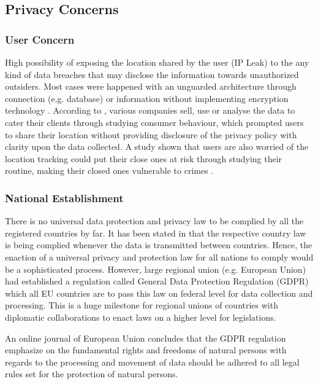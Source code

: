   \subsection{Privacy Concerns}
    \subsubsection{User Concern}
      \par High possibility of exposing the location shared by the user (IP Leak) to the any kind of data breaches that may disclose the information towards unauthorized outsiders. Most cases were happened with an unguarded architecture through connection (e.g. database) or information without implementing encryption technology \parencite{Ian1}. According to \textcite{Ian2}, various companies sell, use or analyse the data to cater their clients through studying consumer behaviour, which prompted users to share their location without providing disclosure of the privacy policy with clarity upon the data collected. A study shown that users are also worried of the location tracking could put their close ones at risk through studying their routine, making their closed ones vulnerable to crimes \parencite{Ian3}.

    \subsubsection{National Establishment}
      \par There is no universal data protection and privacy law to be complied by all the registered countries by far. It has been stated in \textcite{Ian4} that the respective country law is being complied whenever the data is transmitted between countries. Hence, the enaction of a universal privacy and protection law for all nations to comply would be a sophisticated process. However, large regional union (e.g. European Union) had established a regulation called General Data Protection Regulation (GDPR) which all EU countries are to pass this law on federal level for data collection and processing. This is a huge milestone for regional unions of countries with diplomatic collaborations to enact laws on a higher level for legislations.
      \par An online journal of European Union \parencite{Ian5} concludes that the GDPR regulation emphasize on the fundamental rights and freedoms of natural persons with regards to the processing and movement of data should be adhered to all legal rules set for the protection of natural persons.

